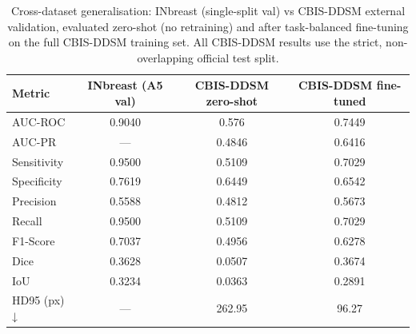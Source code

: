 \begin{table}[t]
\centering
\caption{Cross-dataset generalisation: INbreast (single-split val) vs CBIS-DDSM external validation, evaluated zero-shot (no retraining) and after task-balanced fine-tuning on the full CBIS-DDSM training set. All CBIS-DDSM results use the strict, non-overlapping official test split.}
\label{tab:cbis_ddsm_comparison}
\begin{tabular}{lccc}
\toprule
Metric & INbreast (A5 val) & CBIS-DDSM zero-shot & CBIS-DDSM fine-tuned \\
\midrule
AUC-ROC & 0.9040 & 0.576 & 0.7449 \\
AUC-PR & — & 0.4846 & 0.6416 \\
Sensitivity & 0.9500 & 0.5109 & 0.7029 \\
Specificity & 0.7619 & 0.6449 & 0.6542 \\
Precision & 0.5588 & 0.4812 & 0.5673 \\
Recall & 0.9500 & 0.5109 & 0.7029 \\
F1-Score & 0.7037 & 0.4956 & 0.6278 \\
Dice & 0.3628 & 0.0507 & 0.3674 \\
IoU & 0.3234 & 0.0363 & 0.2891 \\
HD95 (px) ↓ & — & 262.95 & 96.27 \\
\bottomrule
\end{tabular}
\end{table}